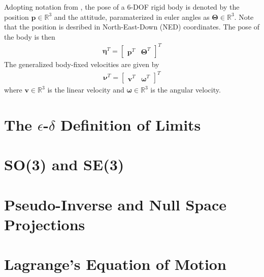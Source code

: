 Adopting notation from \cite{fossen2021}, the pose of a 6-DOF rigid body
is denoted by the position $\bm{p} \in \mathbb{R}^3$ and the attitude, paramaterized
in euler angles as $\bm{\Theta} \in \mathbb{R}^3$. Note that the position is
desribed in North-East-Down (NED) coordinates. The pose of the body is then
\begin{align}
    \bm{\eta}^T = \begin{bmatrix} \bm{p}^T & \bm{\Theta}^T \end{bmatrix}^T
\end{align}
The generalized body-fixed velocities are given by
\begin{align}
    \bm{\nu}^T = \begin{bmatrix} \bm{v}^T & \bm{\omega}^T \end{bmatrix}^T
\end{align}
where $\bm{v} \in \mathbb{R}^3$ is the linear velocity and $\bm{\omega} \in \mathbb{R}^3$
is the angular velocity.
\section{The $\epsilon$-$\delta$ Definition of Limits}
\section{SO(3) and SE(3)}
\section{Pseudo-Inverse and Null Space Projections}
\section{Lagrange's Equation of Motion}
